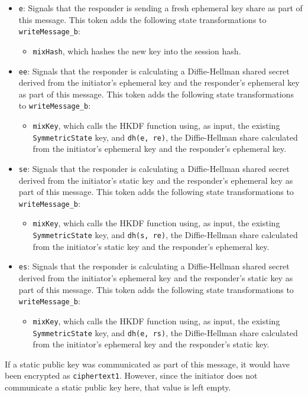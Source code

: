 \begin{itemize}

\item \texttt{e}: Signals that the responder is sending a fresh ephemeral key share as part of this message. This token adds the following state transformations to \texttt{writeMessage\_b}:
\begin{itemize}

\item \texttt{mixHash}, which hashes the new key into the session hash.
\end{itemize}


\item \texttt{ee}: Signals that the responder is calculating a Diffie-Hellman shared secret derived from the initiator's ephemeral key and the responder's ephemeral key as part of this message. This token adds the following state transformations to \texttt{writeMessage\_b}:
\begin{itemize}

\item \texttt{mixKey}, which calls the HKDF function using, as input, the existing \texttt{SymmetricState} key, and \texttt{dh(e, re)}, the Diffie-Hellman share calculated from the initiator's ephemeral key and the responder's ephemeral key.
\end{itemize}


\item \texttt{se}: Signals that the responder is calculating a Diffie-Hellman shared secret derived from the initiator's static key and the responder's ephemeral key as part of this message. This token adds the following state transformations to \texttt{writeMessage\_b}:
\begin{itemize}

\item \texttt{mixKey}, which calls the HKDF function using, as input, the existing \texttt{SymmetricState} key, and \texttt{dh(s, re)}, the Diffie-Hellman share calculated from the initiator's static key and the responder's ephemeral key.
\end{itemize}


\item \texttt{es}: Signals that the responder is calculating a Diffie-Hellman shared secret derived from the initiator's ephemeral key and the responder's static key as part of this message. This token adds the following state transformations to \texttt{writeMessage\_b}:
\begin{itemize}

\item \texttt{mixKey}, which calls the HKDF function using, as input, the existing \texttt{SymmetricState} key, and \texttt{dh(e, rs)}, the Diffie-Hellman share calculated from the initiator's ephemeral key and the responder's static key.
\end{itemize}


\end{itemize}
If a static public key was communicated as part of this message, it would have been encrypted as \texttt{ciphertext1}. However, since the initiator does not communicate a static public key here, that value is left empty.


